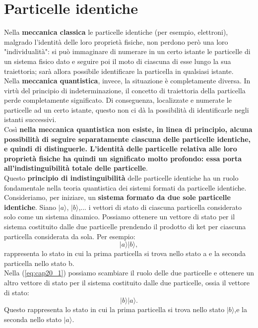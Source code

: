 \chapter[Particelle identiche]{Particelle identiche}
Nella \textbf{meccanica classica} le particelle identiche (per esempio, elettroni), malgrado l'identità delle loro proprietà fisiche, non perdono però una loro "individualità": si può immaginare di numerare in un certo istante le particelle di un sistema fisico dato e seguire poi il moto di ciascuna di esse lungo la sua traiettoria; sarà allora possibile identificare la particella in qualsiasi istante.\\ 

Nella \textbf{meccanica quantistica}, invece, la situazione \`e completamente diversa. In virtù del principio di indeterminazione, il concetto di traiettoria della particella perde completamente significato. Di conseguenza, localizzate e numerate le particelle ad un certo istante, questo non ci dà la possibilità di identificarle negli istanti successivi.\\

Cos\`i \textbf{nella meccanica quantistica non esiste, in linea di principio, alcuna possibilità di seguire separatamente ciascuna delle particelle identiche, e quindi di distinguerle. L'identità delle particelle relativa alle loro proprietà fisiche ha quindi un significato molto profondo: essa porta all'indistinguibilità totale delle particelle}.\\

Questo \textbf{principio di indistinguibilità} delle particelle identiche ha un ruolo fondamentale nella teoria quantistica dei sistemi formati da particelle identiche.\\

Consideriamo, per iniziare, un \textbf{sistema formato da due sole particelle identiche}. Siano $|a\rangle$, $|b\rangle$,... i vettori di stato di ciascuna particella considerato solo come un sistema dinamico. Possiamo ottenere un vettore di stato per il sistema costituito dalle due particelle prendendo il prodotto di ket per ciascuna particella considerata da sola. Per esempio:
	\begin{equation}
		|a\rangle|b\rangle,
	\label{eq:cap20_1}
	\end{equation}
rappresenta lo stato in cui la prima particella si trova nello stato a e la seconda particella nello stato b.\\

Nella (\ref{eq:cap20_1}) possiamo scambiare il ruolo delle due particelle e ottenere un altro vettore di stato per il sistema costituito dalle due particelle, ossia il vettore di stato:\\
	\begin{equation}
		|b\rangle|a\rangle.
	\label{eq:cap20_2}
	\end{equation}
Questo rappresenta lo stato in cui la prima particella si trova nello stato $|b\rangle$,e la seconda nello stato $|a\rangle$.\\

